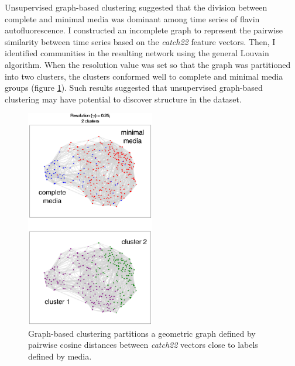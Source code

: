 Unsupervised graph-based clustering suggested that the division between complete and minimal media was dominant among time series of flavin autofluorescence. %
I constructed an incomplete graph to represent the pairwise similarity between time series based on the \emph{catch22} feature vectors.
Then, I identified communities in the resulting network using the general Louvain algorithm.
When the resolution value was set so that the graph was partitioned into two clusters, the clusters conformed well to complete and minimal media groups (figure \ref{fig:EffectofMediaClusters}). %
Such results suggested that unsupervised graph-based clustering may have potential to discover structure in the dataset.

\begin{figure}[htbp]
  \centering
  \includegraphics[width=0.5\textwidth]{10m_EffectofMediaClusters}
  \caption{Graph-based clustering partitions a geometric graph defined by pairwise cosine distances between \emph{catch22} vectors close to labels defined by media.}
  \label{fig:EffectofMediaClusters}
\end{figure}

